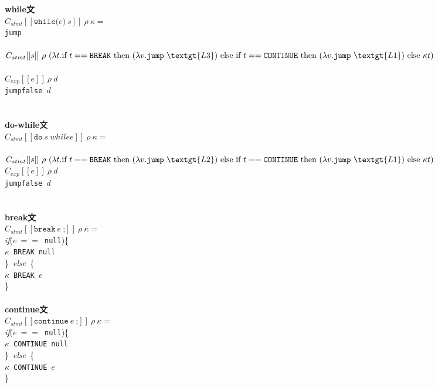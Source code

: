 \documentclass[a4j,12pt]{jarticle}
\begin{document}
{\begin{tabbing}
\textbf{while文} \\
\>$C_{stmt}[[\texttt{while(}e\texttt{)}\ s]]\ \rho\ \kappa =$\\
\>\>\texttt{jump}\  \\
\>\> \\
\>\>$C_{stmt}[[s]]\ \rho\ (\lambda t . \textrm{if}\ t == \texttt{BREAK}\ 
\textrm{then}\ (\lambda v . \texttt{jump}\ \textgt{L3})\ \textrm{else}\ 
\textrm{if}\ t == \texttt{CONTINUE}\ 
\textrm{then}\ (\lambda v . \texttt{jump}\ \textgt{L1})\ \textrm{else}\ 
\kappa t)$ \\
\>\>\textgt{L1:} \\
\>\>$C_{exp}[[e]]\ \rho\ d$ \\
\>\>\texttt{jumpfalse}\ $d$\ \textgt{L2} \\
\>\> \\
\\

\textbf{do-while文} \\
\>$C_{stmt}[[\texttt{do}\ s\ while{e}]]\ \rho\ \kappa =$\\
\>\> \\
\>\>$C_{stmt}[[s]]\ \rho\ (\lambda t . \textrm{if}\ t == \texttt{BREAK}\ 
\textrm{then}\ (\lambda v . \texttt{jump}\ \textgt{L2})\ \textrm{else}\ 
\textrm{if}\ t == \texttt{CONTINUE}\ 
\textrm{then}\ (\lambda v . \texttt{jump}\ \textgt{L1})\ \textrm{else}\ 
\kappa t)$ \\
\>\>$C_{exp}[[e]]\ \rho\ d$ \\
\>\>\texttt{jumpfalse}\ $d$\ \textgt{L1} \\
\>\>\textgt{L2:} \\
\\

\textbf{break文} \\
\>$C_{stmt}[[\texttt{break}\ e\ \texttt{;}]]\ \rho\ \kappa =$\\
\>\>\textit{if}($e\ ==$\ \texttt{null})\{ \\
\>\>\>$\kappa$\ \texttt{BREAK}\ \texttt{null} \\
\>\>\}\ \textit{else}\ \{ \\
\>\>\>$\kappa$\ \texttt{BREAK}\ $e$ \\
\>\>\} \\
\\

\textbf{continue文} \\
\>$C_{stmt}[[\texttt{continue}\ e\ \texttt{;}]]\ \rho\ \kappa =$\\
\>\>\textit{if}($e\ ==$\ \texttt{null})\{ \\
\>\>\>$\kappa$\ \texttt{CONTINUE}\ \texttt{null} \\
\>\>\}\ \textit{else}\ \{ \\
\>\>\>$\kappa$\ \texttt{CONTINUE}\ $e$ \\
\>\>\} \\
\\


\end{tabbing}}
\end{document}
